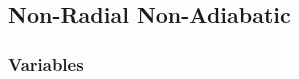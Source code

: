 \documentclass[fleqn]{article}
\newcommand{\diff}{\ensuremath{\mathrm{d}}}
\newcommand{\ii}{\ensuremath{\mathrm{i}}}
\newcommand{\Vg}{\ensuremath{\frac{V}{\Gamma_{1}}}}
\newcommand{\As}{\ensuremath{A^{\ast}}}
\newcommand{\nabad}{\ensuremath{\nabla_{\rm ad}}}
\newcommand{\kapS}{\ensuremath{\kappa_{S}}}
\newcommand{\crad}{\ensuremath{c_{\rm rad}}}
\newcommand{\cepsad}{\ensuremath{c_{\epsilon,{\rm ad}}}}
\newcommand{\cepsS}{\ensuremath{c_{\epsilon,S}}}
\newcommand{\cthm}{\ensuremath{c_{\rm thm}}}
\newcommand{\ckap}{\ensuremath{c_{\rm kap}}}
\begin{document}






\newpage

\subsection*{Non-Radial Non-Adiabatic}

\subsubsection*{Variables}
\end{document}
